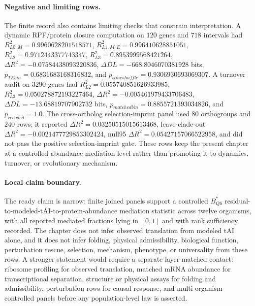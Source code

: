 \paragraph{Negative and limiting rows.}
The finite record also contains limiting checks that constrain interpretation.  A dynamic RPF/protein closure computation on $120$ genes and $718$ intervals had $R^2_{L0,M}=0.9960628201518571$, $R^2_{L1,M,E}=0.996410628851051$, $R^2_{L2}=0.9712443377743347$, $R^2_{L3}=0.8953999568421264$, $\Delta R^2=-0.07584438093220836$, $\Delta DL=-668.8046070381928$ bits, $p_{TEbin}=0.6831683168316832$, and $p_{timeshuffle}=0.9306930693069307$.  A turnover audit on $3290$ genes had $R^2_{L2}=0.055740851626933985$, $R^2_{L3}=0.050278872193227464$, $\Delta R^2=-0.005461979433706483$, $\Delta DL=-13.68819707902732$ bits, $p_{matchedbin}=0.8855721393034826$, and $p_{recoded}=1.0$.  The cross-ortholog selection-imprint panel used $80$ orthogroups and $240$ rows; it reported $\Delta R^2=0.03250515015613468$, leave-clade-out $\Delta R^2=-0.0021477729853302424$, null95 $\Delta R^2=0.05427157066522958$, and did not pass the positive selection-imprint gate.  These rows keep the present chapter at a controlled abundance-mediation level rather than promoting it to dynamics, turnover, or evolutionary mechanism.

\paragraph{Local claim boundary.}
The ready claim is narrow: finite joined panels support a controlled $B^*_{Q6}$ residual-to-modeled-tAI-to-protein-abundance mediation statistic across twelve organisms, with all reported mediated fractions lying in $[0,1]$ and with rank sufficiency recorded.  The chapter does not infer observed translation from modeled tAI alone, and it does not infer folding, physical admissibility, biological function, perturbation rescue, selection, mechanism, phenotype, or universality from these rows.  A stronger statement would require a separate layer-matched contact: ribosome profiling for observed translation, matched mRNA abundance for transcriptional separation, structure or physical assays for folding and admissibility, perturbation rows for causal response, and multi-organism controlled panels before any population-level law is asserted.
